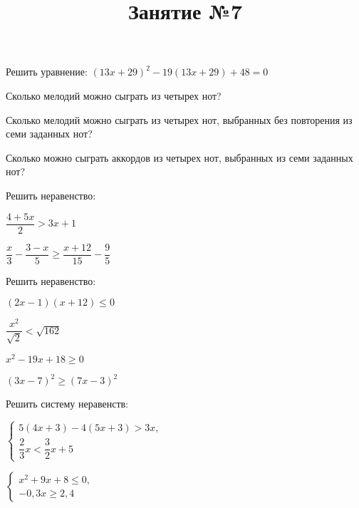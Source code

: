 \newpage
\title{Занятие №7}
\begin{listofex}
	\item Решить уравнение: \( (13x+29)^2-19(13x+29)+48=0 \) 
	\item 
	\begin{enumcols}[itemcolumns=1]
		\item Сколько мелодий можно сыграть из четырех нот? 
		\item Сколько мелодий можно сыграть из четырех нот, выбранных без повторения из семи заданных нот? 
		\item Сколько можно сыграть аккордов из четырех нот, выбранных из семи заданных нот? 
	\end{enumcols}
	\item Решить неравенство:
	\begin{enumcols}[itemcolumns=2]
		\item \( \dfrac{4+5x}{2}>3x+1 \) 
		\item \( \dfrac{x}{3}-\dfrac{3-x}{5}\ge\dfrac{x+12}{15}-\dfrac{9}{5} \) \answer{\( [-\dfrac{6}{7};+\infty) \)}
	\end{enumcols}
	\item Решить неравенство:
	\begin{enumcols}[itemcolumns=2]
		\item \( (2x-1)(x+12)\le0 \) \answer{\( [-12;0,5] \)}
		\item \( \dfrac{x^2}{\sqrt{2}}<\sqrt{162} \) 
		\item \( x^2-19x+18\ge0 \) \answer{\( (-\infty;1]\cup[18;+\infty) \)}
		\item \( (3x-7)^2\ge(7x-3)^2 \) \answer{\( [-1;1] \)}
	\end{enumcols}
	\item Решить систему неравенств:
	\begin{enumcols}[itemcolumns=2]
		\item \( \left\{
		\begin{array}{l}
			5(4x+3)-4(5x+3)>3x,\\
			\dfrac{2}{3}x<\dfrac{3}{2}x+5
		\end{array}
		\right. \) 
		\item \( \left\{
		\begin{array}{l}
			x^2+9x+8\le0,\\
			-0,3x\ge2,4
		\end{array}
		\right. \) 

\end{enumcols}
\end{listofex}

